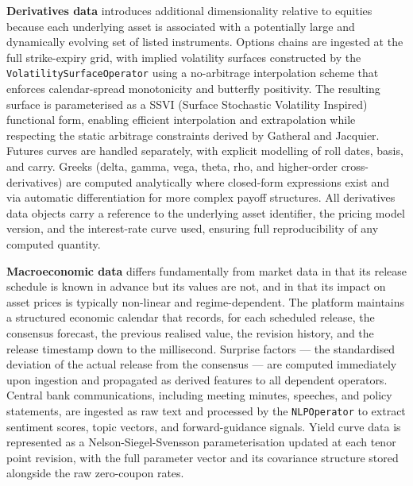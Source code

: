 \documentclass[12pt,openany]{book}
\numberwithin{equation}{chapter}
\theoremstyle{plain}
\theoremstyle{definition}
\theoremstyle{remark}
\begin{document}
\textbf{Derivatives data} introduces additional dimensionality relative to equities because each underlying asset is associated with a potentially large and dynamically evolving set of listed instruments. Options chains are ingested at the full strike-expiry grid, with implied volatility surfaces constructed by the \texttt{VolatilitySurfaceOperator} using a no-arbitrage interpolation scheme that enforces calendar-spread monotonicity and butterfly positivity. The resulting surface is parameterised as a SSVI (Surface Stochastic Volatility Inspired) functional form, enabling efficient interpolation and extrapolation while respecting the static arbitrage constraints derived by Gatheral and Jacquier. Futures curves are handled separately, with explicit modelling of roll dates, basis, and carry. Greeks (delta, gamma, vega, theta, rho, and higher-order cross-derivatives) are computed analytically where closed-form expressions exist and via automatic differentiation for more complex payoff structures. All derivatives data objects carry a reference to the underlying asset identifier, the pricing model version, and the interest-rate curve used, ensuring full reproducibility of any computed quantity.

\textbf{Macroeconomic data} differs fundamentally from market data in that its release schedule is known in advance but its values are not, and in that its impact on asset prices is typically non-linear and regime-dependent. The platform maintains a structured economic calendar that records, for each scheduled release, the consensus forecast, the previous realised value, the revision history, and the release timestamp down to the millisecond. Surprise factors --- the standardised deviation of the actual release from the consensus --- are computed immediately upon ingestion and propagated as derived features to all dependent operators. Central bank communications, including meeting minutes, speeches, and policy statements, are ingested as raw text and processed by the \texttt{NLPOperator} to extract sentiment scores, topic vectors, and forward-guidance signals. Yield curve data is represented as a Nelson-Siegel-Svensson parameterisation updated at each tenor point revision, with the full parameter vector and its covariance structure stored alongside the raw zero-coupon rates.
\end{document}
